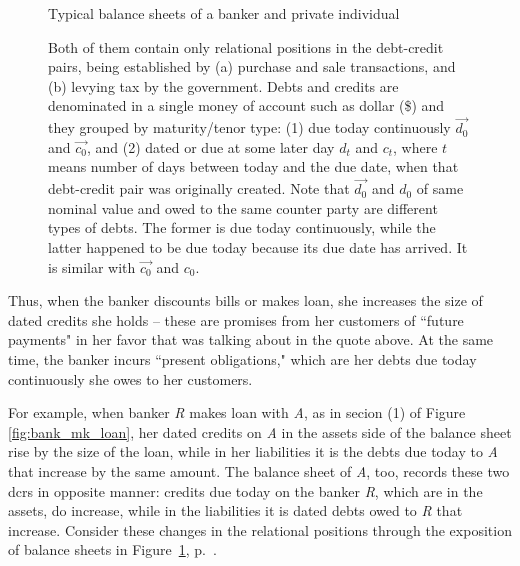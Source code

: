 \begin{figure}[!ht]
  {Typical balance sheets of a banker and private individual\par \vspace{.05in}Both of them contain only relational positions in the debt-credit pairs, being established by (a) purchase and sale transactions, and (b) levying tax by the government. Debts and credits are denominated in a single money of account such as dollar (\$) and they grouped by maturity/tenor type: (1) due today continuously $\overrightarrow{d_{0}}$ and $\overrightarrow{c_{0}}$, and (2) dated or due at some later day $d_t$ and $c_t$, where $t$ means number of days between today and the due date, when that debt-credit pair was originally created. Note that $\overrightarrow{d_{0}}$ and $d_0$ of same nominal value and owed to the same counter party are different types of debts. The former is due today continuously, while the latter happened to be due today because its due date has arrived. It is similar with $\overrightarrow{c_{0}}$ and $c_0$.}
  \label{fig:bs_bnk_indv}
\end{figure}

Thus, when the banker discounts bills or makes loan, she increases the size of dated credits she holds -- these are promises from her customers of ``future payments" in her favor that \citeauthor{innes1913} was talking about in the quote above. At the same time, the banker incurs ``present obligations," which are her debts due today continuously she owes to her customers. 

For example, when banker \textit{R} makes loan with \textit{A}, as in secion (1) of Figure \ref{fig:bank_mk_loan}, her dated credits on \textit{A} in the assets side of the balance sheet rise by the size of the loan, while in her liabilities it is the debts due today to \textit{A} that increase by the same amount. The balance sheet of \textit{A}, too, records these two \acfp{dcr} in opposite manner: credits due today on the banker \textit{R}, which are in the assets, do increase, while in the liabilities it is dated debts owed to \textit{R} that increase. Consider these changes in the relational positions through the exposition of balance sheets in Figure~\ref{fig:bs_bnk_indv}, p.~\pageref{fig:bs_bnk_indv}.

